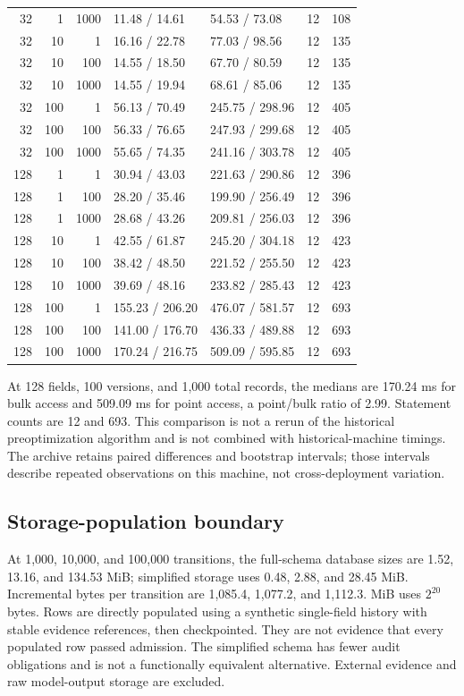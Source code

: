 \documentclass[11pt,a4paper]{article}
\begin{document}
\begin{longtable}{@{}rrrllrr@{}}
32 & 1 & 1000 & 11.48 / 14.61 & 54.53 / 73.08 & 12 & 108 \\
32 & 10 & 1 & 16.16 / 22.78 & 77.03 / 98.56 & 12 & 135 \\
32 & 10 & 100 & 14.55 / 18.50 & 67.70 / 80.59 & 12 & 135 \\
32 & 10 & 1000 & 14.55 / 19.94 & 68.61 / 85.06 & 12 & 135 \\
32 & 100 & 1 & 56.13 / 70.49 & 245.75 / 298.96 & 12 & 405 \\
32 & 100 & 100 & 56.33 / 76.65 & 247.93 / 299.68 & 12 & 405 \\
32 & 100 & 1000 & 55.65 / 74.35 & 241.16 / 303.78 & 12 & 405 \\
128 & 1 & 1 & 30.94 / 43.03 & 221.63 / 290.86 & 12 & 396 \\
128 & 1 & 100 & 28.20 / 35.46 & 199.90 / 256.49 & 12 & 396 \\
128 & 1 & 1000 & 28.68 / 43.26 & 209.81 / 256.03 & 12 & 396 \\
128 & 10 & 1 & 42.55 / 61.87 & 245.20 / 304.18 & 12 & 423 \\
128 & 10 & 100 & 38.42 / 48.50 & 221.52 / 255.50 & 12 & 423 \\
128 & 10 & 1000 & 39.69 / 48.16 & 233.82 / 285.43 & 12 & 423 \\
128 & 100 & 1 & 155.23 / 206.20 & 476.07 / 581.57 & 12 & 693 \\
128 & 100 & 100 & 141.00 / 176.70 & 436.33 / 489.88 & 12 & 693 \\
128 & 100 & 1000 & 170.24 / 216.75 & 509.09 / 595.85 & 12 & 693 \\
\end{longtable}
\endgroup


At 128 fields, 100 versions, and 1,000 total records, the medians are 170.24 ms for bulk access and 509.09 ms for point access, a point/bulk ratio of 2.99. Statement counts are 12 and 693. This comparison is not a rerun of the historical preoptimization algorithm and is not combined with historical-machine timings. The archive retains paired differences and bootstrap intervals; those intervals describe repeated observations on this machine, not cross-deployment variation.

\subsection{Storage-population boundary}

At 1,000, 10,000, and 100,000 transitions, the full-schema database sizes are 1.52, 13.16, and 134.53 MiB; simplified storage uses 0.48, 2.88, and 28.45 MiB. Incremental bytes per transition are 1,085.4, 1,077.2, and 1,112.3. MiB uses $2^{20}$ bytes. Rows are directly populated using a synthetic single-field history with stable evidence references, then checkpointed. They are not evidence that every populated row passed admission. The simplified schema has fewer audit obligations and is not a functionally equivalent alternative. External evidence and raw model-output storage are excluded.
\end{document}

